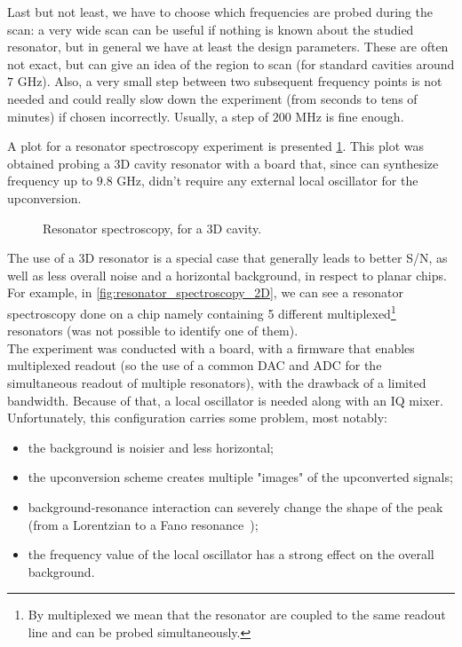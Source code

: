 Last but not least, we have to choose which frequencies are probed during the scan: a very wide scan can be useful if nothing is known about the studied resonator, but in general we have at least the design parameters.
These are often not exact, but can give an idea of the region to scan (for standard cavities around $7$ GHz).
Also, a very small step between two subsequent frequency points is not needed and could really slow down the experiment (from seconds to tens of minutes) if chosen incorrectly.
Usually, a step of $200$ MHz is fine enough.

A plot for a resonator spectroscopy experiment is presented \cref{fig:resonator_spectroscopy_3D}.
This plot was obtained probing a 3D cavity resonator with a \RFSoC board that, since can synthesize frequency up to $9.8$ GHz, didn't require any external local oscillator for the upconversion.

\begin{figure}[ht]
    \caption{Resonator spectroscopy, for a 3D cavity.}
    \label{fig:resonator_spectroscopy_3D}
\end{figure}

The use of a 3D resonator is a special case that generally leads to better S/N, as well as less overall noise and a horizontal background, in respect to planar chips.\\
For example, in \cref{fig:resonator_spectroscopy_2D}, we can see a resonator spectroscopy done on a chip namely containing 5 different multiplexed\footnote{By multiplexed we mean that the resonator are coupled to the same readout line and can be probed simultaneously.} resonators (was not possible to identify one of them).\\
The experiment was conducted with a \ZCU board, with a firmware that enables multiplexed readout (so the use of a common DAC and ADC for the simultaneous readout of multiple resonators), with the drawback of a limited bandwidth. 
Because of that, a local oscillator is needed along with an IQ mixer.
Unfortunately, this configuration carries some problem, most notably:
\begin{itemize}
    \item the background is noisier and less horizontal;
    \item the upconversion scheme creates multiple "images" of the upconverted signals;
    \item background-resonance interaction can severely change the shape of the peak (from a Lorentzian to a Fano resonance~\cite{Fano1961, Limonov2017});
    \item the frequency value of the local oscillator has a strong effect on the overall background.
\end{itemize}

